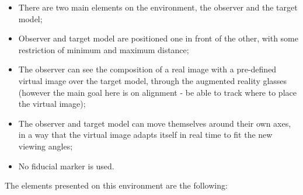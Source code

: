 \documentclass[msc, a4paper, classic, en]{ufbathesis}
\begin{document}
\begin{itemize}
  \item There are two main elements on the environment, the observer and the target model;
  \item Observer and target model are positioned one in front of the other, with some restriction of minimum and maximum distance;
  \item The observer can see the composition of a real image with a pre-defined virtual image over the target model, through the augmented
        reality glasses (however the main goal here is on alignment - be able to track where to place the virtual image);
  \item The observer and target model can move themselves around their own axes, in a way that the virtual image adapts itself in real time to fit the new
        viewing angles;
  \item No fiducial marker is used.
\end{itemize}

The elements presented on this environment are the following:
\end{document}
